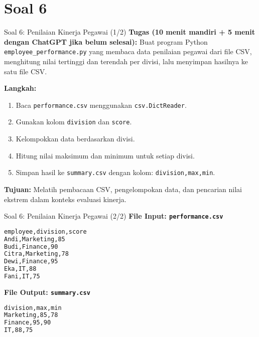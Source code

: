 \documentclass[aspectratio=169, table]{beamer}
\begin{document}
\section{Soal 6}
\begin{frame}[fragile]{Soal 6: Penilaian Kinerja Pegawai (1/2)}
\vspace{15pt}
\textbf{Tugas (10 menit mandiri + 5 menit dengan ChatGPT jika belum selesai):}  
Buat program Python \texttt{employee\_performance.py} yang membaca data penilaian pegawai dari file CSV, menghitung nilai tertinggi dan terendah per divisi, lalu menyimpan hasilnya ke satu file CSV.

\textbf{Langkah:}
\begin{enumerate}
  \item Baca \texttt{performance.csv} menggunakan \texttt{csv.DictReader}.
  \item Gunakan kolom \texttt{division} dan \texttt{score}.
  \item Kelompokkan data berdasarkan divisi.
  \item Hitung nilai maksimum dan minimum untuk setiap divisi.
  \item Simpan hasil ke \texttt{summary.csv}  
        dengan kolom: \texttt{division,max,min}.
\end{enumerate}

\textbf{Tujuan:}  
Melatih pembacaan CSV, pengelompokan data, dan pencarian nilai ekstrem dalam konteks evaluasi kinerja.
\end{frame}

\begin{frame}[fragile]{Soal 6: Penilaian Kinerja Pegawai (2/2)}
\vspace{15pt}
\textbf{File Input: \texttt{performance.csv}}
\begin{lstlisting}[language=bash,basicstyle=\ttfamily\small]
employee,division,score
Andi,Marketing,85
Budi,Finance,90
Citra,Marketing,78
Dewi,Finance,95
Eka,IT,88
Fani,IT,75
\end{lstlisting}

\textbf{File Output: \texttt{summary.csv}}
\begin{lstlisting}[language=bash,basicstyle=\ttfamily\small]
division,max,min
Marketing,85,78
Finance,95,90
IT,88,75
\end{lstlisting}
\end{frame}
\end{document}
